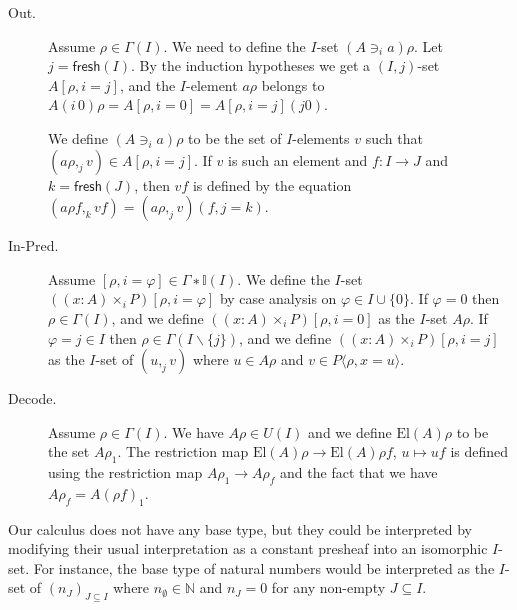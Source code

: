 \documentclass[english]{PaperTools/latex/lipics}
\newcommand\CTimes[2]{(#2) ×_{#1}}
\newcommand\op[1]{∋_{#1}}
\def\fresh#1{\mathsf{fresh}(#1)}
\def\El#1{\mathrm{El}(#1)}
\begin{document}
\begin{description}
  \item[\sc Out.]
    Assume $ρ ∈ Γ(I)$. We need to define the $I$-set $(A \op {i} a)ρ$.
    Let $j = \fresh I$.
    By the induction hypotheses we get a $(I,j)$-set $A[ρ,i=j]$,
    and the $I$-element $aρ$ belongs to
    $A(i\,0)ρ = A[ρ,i=0] = A[ρ,i=j](j 0)$.

    We define $(A \op {i} a)ρ$ to be the set of $I$-elements $v$ such that
    $(aρ,_j v) ∈ A[ρ,i=j]$.
    If $v$ is such an element and $f : I → J$ and $k=\fresh J$, then
    $vf$ is defined by the equation $(aρf,_k vf) = (aρ ,_j v)(f, j=k)$.


  \item[\sc In-Pred.]
    Assume $[ρ,i=φ] ∈ Γ∗𝕀(I)$.  We define the $I$-set $(\CTimes i {x:A} P)[ρ,i=φ]$
    by case analysis on $φ ∈ I∪\{0\}$.
    If $φ = 0$ then $ρ ∈ Γ(I)$, and we define $(\CTimes i {x:A} P)[ρ,i=0]$ as
    the $I$-set $Aρ$.
    If $φ = j ∈ I$ then $ρ ∈ Γ(I\backslash\{j\})$, and we define
    $(\CTimes i {x:A} P)[ρ,i=j]$ as the $I$-set of $(u ,_j v)$ where
    $u ∈ Aρ$ and $v ∈ P⟨ρ,x=u⟩$.


  \item[\sc Decode.]
    Assume $ρ ∈ Γ(I)$.  We have $Aρ ∈ U(I)$ and we define
    $\El{A}ρ$ to be the set $Aρ_1$.
    The restriction map $\El{A}ρ → \El{A}ρf$, $u ↦ uf$ is defined
    using the restriction map $Aρ_1 → Aρ_f$ and the fact that we have
    $Aρ_f = A(ρf)_1$.
\end{description}

\begin{remark}
  Our calculus does not have any base type, but they could be interpreted
  by modifying their usual interpretation as a constant presheaf into an
  isomorphic $I$-set.
  For instance, the base type of natural numbers would be interpreted as
  the $I$-set of $(n_J)_{J ⊆ I}$ where $n_∅ ∈ ℕ$ and $n_J = 0$ for any
  non-empty $J ⊆ I$.
\end{remark}
\end{document}
